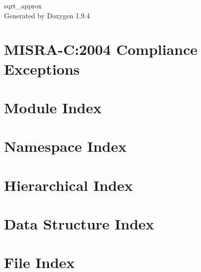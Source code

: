 \documentclass[twoside]{book}
\newcommand{\+}{\discretionary{\mbox{\scriptsize$\hookleftarrow$}}{}{}}
\newcommand{\clearemptydoublepage}{%
    \newpage{\pagestyle{empty}\cleardoublepage}%
  }
\begin{document}
  \raggedbottom
    \hypersetup{pageanchor=false,
                bookmarksnumbered=true,
                pdfencoding=unicode
               }
  \begin{titlepage}
  \vspace*{7cm}
  \begin{center}%
  {\Large sqrt\+\_\+approx}\\
  \vspace*{1cm}
  {\large Generated by Doxygen 1.9.4}\\
  \end{center}
  \end{titlepage}
  \clearemptydoublepage
  \tableofcontents
  \clearemptydoublepage
  \hypersetup{pageanchor=true}
\chapter{MISRA-\/C\+:2004 Compliance Exceptions}
\label{_c_m_s_i_s__m_i_s_r_a__exceptions}

\chapter{Module Index}

\chapter{Namespace Index}

\chapter{Hierarchical Index}

\chapter{Data Structure Index}

\chapter{File Index}

\end{document}
